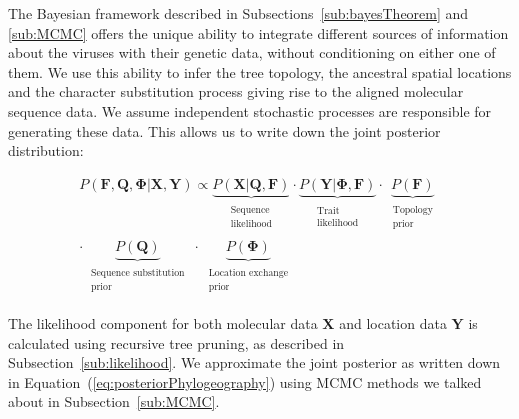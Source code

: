 The Bayesian framework described in Subsections~\ref{sub:bayesTheorem} and \ref{sub:MCMC} offers the unique ability to integrate different sources of information about the viruses with their genetic data, without conditioning on either one of them.
We use this ability to infer the tree topology, the ancestral spatial locations and the character substitution process giving rise to the aligned molecular sequence data. 
We assume independent stochastic processes are responsible for generating these data.
This allows us to write down the joint posterior distribution: 


\begin{eqnarray}
P\left(\mathbf{F}, \mathbf{Q}, \mathbf{\Phi}|\mathbf{X},\mathbf{Y}\right)\propto 
\underbrace{P(\mathbf{X}|\mathbf{Q}, \mathbf{F})}_{\begin{array}{c}
\substack{\text{Sequence} \\ \text{likelihood}}
\end{array}}\cdot\underbrace{P(\mathbf{Y}|\mathbf{\Phi}, \mathbf{F})}_{\begin{array}{c}
\substack{\text{Trait} \\ \text{likelihood}}
\end{array}}\cdot
\underbrace{P(\mathbf{F})}_{\begin{array}{c}
\substack{\text{Topology} \\ \text{prior}}
\end{array}} \\ \nonumber
\cdot\underbrace{P(\mathbf{Q})}_{\begin{array}{c}
\substack{\text{Sequence substitution} \\ \text{prior}}
\end{array}}\cdot\underbrace{P(\mathbf{\Phi})}_{\begin{array}{c}
\substack{\text{Location exchange} \\ \text{prior}}
\end{array}}
\label{eq:posteriorPhylogeography}
\end{eqnarray}

The likelihood component for both molecular data $\mathbf{X}$ and location data $\mathbf{Y}$ is calculated using recursive tree pruning, as described in Subsection~\ref{sub:likelihood}.
We approximate the joint posterior as written down in Equation~(\ref{eq:posteriorPhylogeography}) using MCMC methods we talked about in Subsection~\ref{sub:MCMC}.
